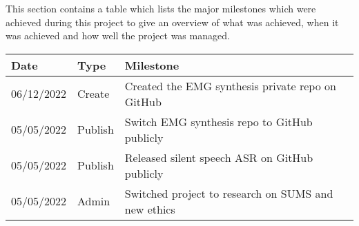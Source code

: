 This section contains a table which lists the major milestones which were
achieved during this project to give an overview of what was achieved, when it was
achieved and how well the project was managed.

{\small\begin{center}
    \begin{tabularx}{\textwidth}{ l l l }
        Date & Type & Milestone \\
        \hline
        06/12/2022 & Create & Created the EMG synthesis private repo on GitHub \\
        05/05/2022 & Publish & Switch EMG synthesis repo to GitHub publicly \\
        05/05/2022 & Publish & Released silent speech ASR on GitHub publicly \\
        05/05/2022 & Admin & Switched project to research on SUMS and new ethics
    \end{tabularx}
\end{center}}